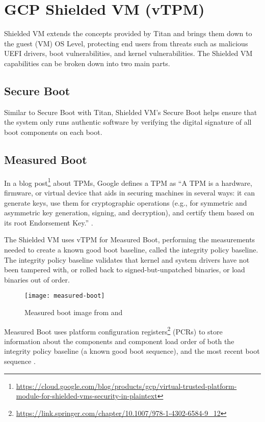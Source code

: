 
\section*{GCP Shielded VM (vTPM)}


Shielded VM extends the concepts provided by Titan 
and brings them down to the guest (VM) OS Level, 
protecting end users from threats such as malicious UEFI drivers, 
boot vulnerabilities, and kernel vulnerabilities. 
The Shielded VM capabilities can be broken down into two main parts.

\subsection*{Secure Boot}
Similar to Secure Boot with Titan, 
Shielded VM’s Secure Boot helps ensure that the system only runs authentic software 
by verifying the digital signature of all boot components on each boot.

\subsection*{Measured Boot}
In a blog post\footnote{\url{https://cloud.google.com/blog/products/gcp/virtual-trusted-platform-module-for-shielded-vms-security-in-plaintext}} 
about TPMs, Google defines a TPM as 
“A TPM is a hardware, firmware, or virtual device that aids in securing machines 
in several ways: it can generate keys, use them for cryptographic operations 
(e.g., for symmetric and asymmetric key generation, signing, and decryption), 
and certify them based on its root Endorsement Key.” 
\citep{zimmerman_virtual_2018}.

The Shielded VM uses vTPM for Measured Boot, 
performing the measurements needed to create a known good boot baseline, 
called the integrity policy baseline. 
The integrity policy baseline validates that kernel and system drivers 
have not been tampered with, or rolled back to signed-but-unpatched binaries,
or load binaries out of order.

\begin{figure}[!ht]
    \centering
    \texttt{[image: measured-boot]}
    \caption{Measured boot image from \cite{leibl_gcp_2022} and \cite{google_what_2022}}
    \label{fig:measured-boot}
\end{figure}


Measured Boot uses 
platform configuration registers\footnote{\url{https://link.springer.com/chapter/10.1007/978-1-4302-6584-9_12}} 
(PCRs) 
to store information about the components and component load order 
of both the integrity policy baseline 
(a known good boot sequence), 
and the most recent boot sequence 
\citep{arthur_platform_2015}.

